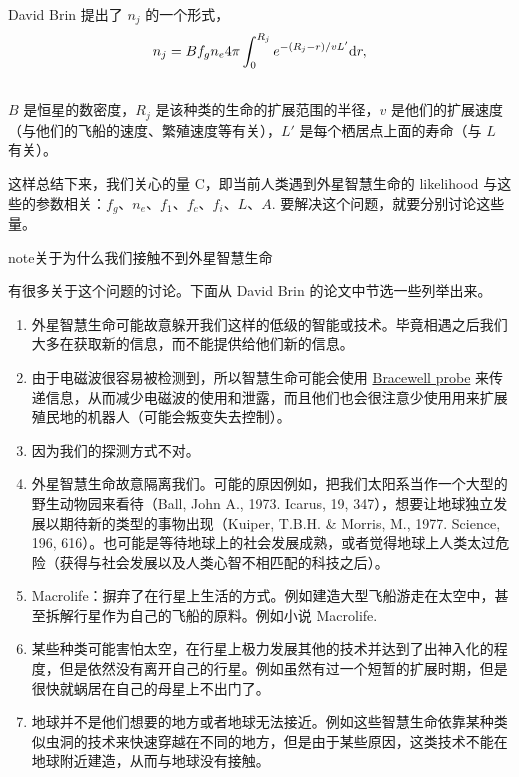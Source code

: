 \documentclass[letterpaper,10pt,english]{sphinxmanual}
\begin{document}
David Brin 提出了 $n_j$ 的一个形式，
\begin{gather}
\begin{split}n_j = B f_g n_e 4 \pi \int_0^{R_j} e^{-(R_j-r)/v L'}\mathrm d r,\end{split}\notag\\\begin{split}\end{split}\notag
\end{gather}
$B$ 是恒星的数密度，$R_j$ 是该种类的生命的扩展范围的半径，$v$ 是他们的扩展速度（与他们的飞船的速度、繁殖速度等有关），$L'$ 是每个栖居点上面的寿命（与 $L$ 有关）。

这样总结下来，我们关心的量 C，即当前人类遇到外星智慧生命的 likelihood 与这些的参数相关：$f_g$、$n_e$、$f_1$、$f_c$、$f_i$、$L$、$A$. 要解决这个问题，就要分别讨论这些量。

\begin{notice}{note}{关于为什么我们接触不到外星智慧生命}

有很多关于这个问题的讨论。下面从 David Brin 的论文中节选一些列举出来。
\begin{enumerate}
\item {} 
外星智慧生命可能故意躲开我们这样的低级的智能或技术。毕竟相遇之后我们大多在获取新的信息，而不能提供给他们新的信息。

\item {} 
由于电磁波很容易被检测到，所以智慧生命可能会使用 \href{https://en.wikipedia.org/wiki/Bracewell\_probe}{Bracewell probe} 来传递信息，从而减少电磁波的使用和泄露，而且他们也会很注意少使用用来扩展殖民地的机器人（可能会叛变失去控制）。

\item {} 
因为我们的探测方式不对。

\item {} 
外星智慧生命故意隔离我们。可能的原因例如，把我们太阳系当作一个大型的野生动物园来看待（Ball, John A., 1973. Icarus, 19, 347），想要让地球独立发展以期待新的类型的事物出现（Kuiper, T.B.H. \& Morris, M., 1977. Science, 196, 616）。也可能是等待地球上的社会发展成熟，或者觉得地球上人类太过危险（获得与社会发展以及人类心智不相匹配的科技之后）。

\item {} 
Macrolife：摒弃了在行星上生活的方式。例如建造大型飞船游走在太空中，甚至拆解行星作为自己的飞船的原料。例如小说 Macrolife.

\item {} 
某些种类可能害怕太空，在行星上极力发展其他的技术并达到了出神入化的程度，但是依然没有离开自己的行星。例如虽然有过一个短暂的扩展时期，但是很快就蜗居在自己的母星上不出门了。

\item {} 
地球并不是他们想要的地方或者地球无法接近。例如这些智慧生命依靠某种类似虫洞的技术来快速穿越在不同的地方，但是由于某些原因，这类技术不能在地球附近建造，从而与地球没有接触。

\end{enumerate}
\end{notice}
\end{document}
